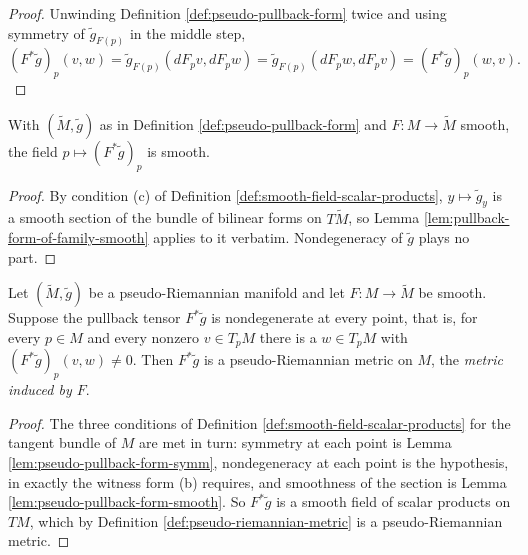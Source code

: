 \begin{proof}
\leanok
{}
Unwinding Definition \ref{def:pseudo-pullback-form} twice and using symmetry of $\tilde{g}_{F(p)}$ in the middle step,
\[
  (F^*\tilde{g})_p(v,w) = \tilde{g}_{F(p)}(dF_pv, dF_pw) = \tilde{g}_{F(p)}(dF_pw, dF_pv) = (F^*\tilde{g})_p(w,v) .
\]
\end{proof}

\begin{lemma}
\label{lem:pseudo-pullback-form-smooth}
\leanok
{}
With $(\tilde{M},\tilde{g})$ as in Definition \ref{def:pseudo-pullback-form} and $F : M \to \tilde{M}$ smooth, the field $p \mapsto (F^*\tilde{g})_p$ is smooth.
\end{lemma}

\begin{proof}
\leanok
{}
By condition (c) of Definition \ref{def:smooth-field-scalar-products}, $y \mapsto \tilde{g}_y$ is a smooth section of the bundle of bilinear forms on $T\tilde{M}$, so Lemma \ref{lem:pullback-form-of-family-smooth} applies to it verbatim. Nondegeneracy of $\tilde{g}$ plays no part.
\end{proof}

\begin{definition}
\label{def:pseudo-induced-metric}
\leanok
{}
Let $(\tilde{M},\tilde{g})$ be a pseudo-Riemannian manifold and let $F : M \to \tilde{M}$ be smooth. Suppose the pullback tensor $F^*\tilde{g}$ is nondegenerate at every point, that is, for every $p \in M$ and every nonzero $v \in T_pM$ there is a $w \in T_pM$ with $(F^*\tilde{g})_p(v,w) \neq 0$. Then $F^*\tilde{g}$ is a pseudo-Riemannian metric on $M$, the \emph{metric induced by $F$}.
\end{definition}

\begin{proof}
\leanok
{}
The three conditions of Definition \ref{def:smooth-field-scalar-products} for the tangent bundle of $M$ are met in turn: symmetry at each point is Lemma \ref{lem:pseudo-pullback-form-symm}, nondegeneracy at each point is the hypothesis, in exactly the witness form (b) requires, and smoothness of the section is Lemma \ref{lem:pseudo-pullback-form-smooth}. So $F^*\tilde{g}$ is a smooth field of scalar products on $TM$, which by Definition \ref{def:pseudo-riemannian-metric} is a pseudo-Riemannian metric.
\end{proof}

